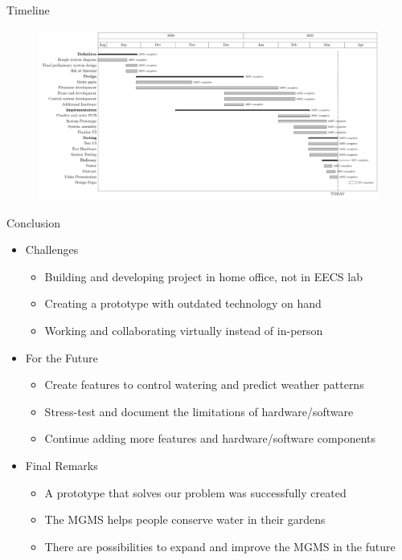 \documentclass{beamer}
\begin{document}
\begin{frame}{Timeline}
    \begin{figure}
        \centering
        \includegraphics[width=\linewidth]{PNGs/Gantt-Mar-25.PNG}
    \end{figure}
\end{frame}


\begin{frame}{Conclusion}
    \begin{itemize}
        \item
              Challenges
              \begin{itemize}
                  \item
                        Building and developing project in home office, not in EECS lab
                  \item
                        Creating a prototype with outdated technology on hand
                  \item
                        Working and collaborating virtually instead of in-person
              \end{itemize}
        \item
              For the Future
              \begin{itemize}
                  \item
                        Create features to control watering and predict weather patterns
                  \item
                        Stress-test and document the limitations of hardware/software
                  \item
                        Continue adding more features and hardware/software components
              \end{itemize}
        \item
              Final Remarks
              \begin{itemize}
                  \item
                        A prototype that solves our problem was successfully created
                  \item
                        The MGMS helps people conserve water in their gardens
                  \item
                        There are possibilities to expand and improve the MGMS in the future
              \end{itemize}
    \end{itemize}

\end{frame}
\end{document}
